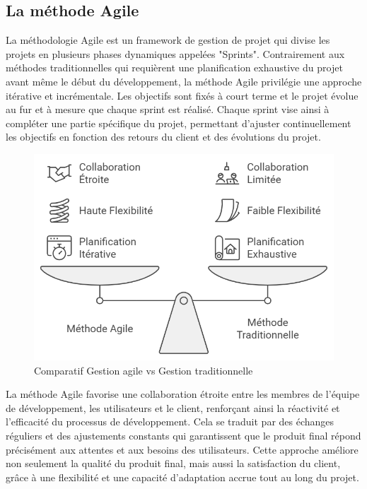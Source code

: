 {\subsection*{La méthode Agile}
La méthodologie Agile est un framework de gestion de projet qui divise les projets en plusieurs phases dynamiques appelées "Sprints". Contrairement aux méthodes traditionnelles qui requièrent une planification exhaustive du projet avant même le début du développement, la méthode Agile privilégie une approche itérative et incrémentale. Les objectifs sont fixés à court terme et le projet évolue au fur et à mesure que chaque sprint est réalisé. Chaque sprint vise ainsi à compléter une partie spécifique du projet, permettant d’ajuster continuellement les objectifs en fonction des retours du client et des évolutions du projet.

\vspace{0.3cm}

\begin{figure}[H]
\begin{center}
\includegraphics[width=15cm]{assets/presentation/1_gestion_agile_vs_gestion_traditionnelle.png}
\end{center}
\caption{Comparatif Gestion agile vs Gestion traditionnelle}
\end{figure}

La méthode Agile favorise une collaboration étroite entre les membres de l’équipe de développement, les utilisateurs et le client, renforçant ainsi la réactivité et l’efficacité du processus de développement. Cela se traduit par des échanges réguliers et des ajustements constants qui garantissent que le produit final répond précisément aux attentes et aux besoins des utilisateurs. Cette approche améliore non seulement la qualité du produit final, mais aussi la satisfaction du client, grâce à une flexibilité et une capacité d’adaptation accrue tout au long du projet. 

}
